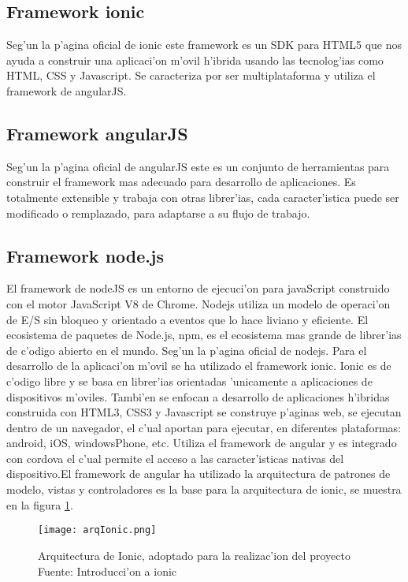 \subsection{Framework ionic}
Seg'un la p'agina oficial de  ionic este framework es un SDK para HTML5 que nos ayuda a construir una aplicaci'on m'ovil h'ibrida usando las tecnolog'ias como HTML, CSS y Javascript. Se caracteriza por ser multiplataforma y utiliza el framework de angularJS.

\subsection{Framework angularJS}
Seg'un la p'agina oficial de angularJS este es un conjunto de  herramientas  para construir el framework  mas adecuado para desarrollo de aplicaciones. Es totalmente extensible y trabaja con otras librer'ias, cada caracter'istica puede ser modificado o remplazado, para adaptarse a su  flujo de trabajo.

\subsection{Framework node.js}
El framework de nodeJS es un entorno de ejecuci'on para javaScript construido con el motor JavaScript V8 de Chrome. Nodejs utiliza un modelo de operaci'on de E/S sin bloqueo y orientado a eventos que lo hace liviano y eficiente. El ecosistema de paquetes de Node.js, npm, es el ecosistema mas grande de librer'ias de c'odigo abierto en el mundo. Seg'un la p'agina oficial de nodejs.
Para el desarrollo de la aplicaci'on m'ovil se ha utilizado el framework ionic.
Ionic es de c'odigo libre y se basa en librer'ias orientadas 'unicamente a aplicaciones de dispositivos m'oviles. Tambi'en se enfocan a desarrollo de aplicaciones h'ibridas construida con HTML3, CSS3 y Javascript se construye p'aginas web, se ejecutan dentro de un navegador, el c'ual aportan para ejecutar, en diferentes plataformas: android, iOS, windowsPhone, etc. Utiliza el framework de angular y es integrado con cordova el c'ual permite el acceso a las caracter'isticas nativas del dispositivo.El framework de angular ha  utilizado la arquitectura de patrones de modelo, vistas y controladores es la base para la arquitectura de ionic, se muestra en la figura \ref{fig:Ionic}.

\begin{figure}[H]
\centering
 \texttt{[image: arqIonic.png]}
 \captionsetup{justification=centering,margin=2cm}
 \caption{Arquitectura de Ionic, adoptado para la realizac'ion del proyecto Fuente: Introducci'on a ionic\cite{Gallego}}
\label{fig:Ionic}
\end{figure}

